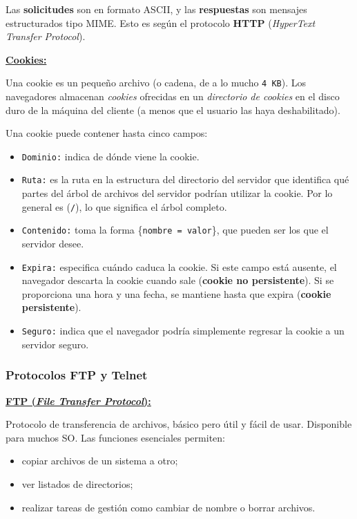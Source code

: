 \documentclass[10pt,a4paper]{article}
\begin{document}
Las \textbf{solicitudes} son en formato ASCII, y las \textbf{respuestas} son mensajes estructurados tipo MIME. Esto es según el protocolo \textbf{HTTP} (\textit{HyperText Transfer Protocol}).

\underline{\textbf{Cookies:}}

Una cookie es un pequeño archivo (o cadena, de a lo mucho \texttt{4 KB}). Los navegadores almacenan \textit{cookies} ofrecidas en un \textit{directorio de cookies} en el disco duro de la máquina del cliente (a menos que el usuario las haya deshabilitado).

Una cookie puede contener hasta cinco campos:

\begin{itemize}
\item \texttt{Dominio:} indica de dónde viene la cookie. 
\item \texttt{Ruta:} es la ruta en la estructura del directorio del servidor que identifica qué partes del árbol de archivos del servidor podrían utilizar la cookie. Por lo general es (\texttt{/}), lo que significa el árbol completo.
\item \texttt{Contenido:} toma la forma \{\texttt{nombre = valor}\}, que pueden ser los
que el servidor desee.
\item \texttt{Expira:} especifica cuándo caduca la cookie. Si este campo está ausente, el navegador descarta la cookie cuando sale (\textbf{cookie no persistente}). Si se proporciona una hora y una fecha, se mantiene hasta que expira (\textbf{cookie persistente}).
\item \texttt{Seguro:} indica que el navegador podría simplemente regresar la cookie a un servidor seguro.
\end{itemize}

\subsubsection{Protocolos FTP y Telnet}

\underline{\textbf{FTP (\textit{File Transfer Protocol}):}}

Protocolo de transferencia de archivos, básico pero útil y fácil de usar. Disponible para muchos SO. Las funciones esenciales permiten:
\begin{itemize}
\item copiar archivos de un sistema a otro;
\item ver listados de directorios;
\item realizar tareas de gestión como cambiar de nombre o borrar archivos.
\end{itemize}
\end{document}
